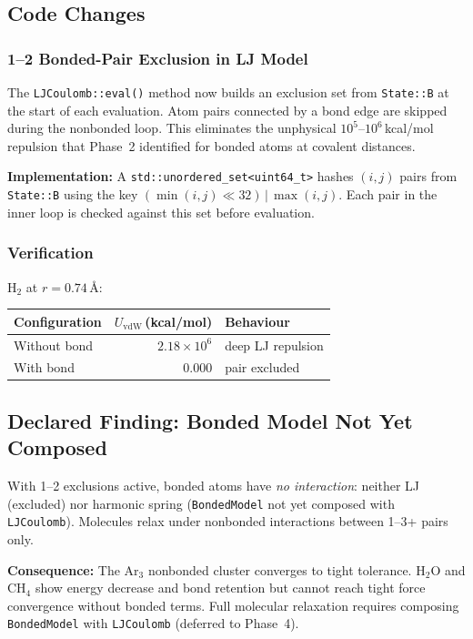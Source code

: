 \documentclass[11pt]{article}
\begin{document}
\subsection{Code Changes}

\subsubsection{1--2 Bonded-Pair Exclusion in LJ Model}

The \texttt{LJCoulomb::eval()} method now builds an exclusion set from
\texttt{State::B} at the start of each evaluation.  Atom pairs connected by
a bond edge are skipped during the nonbonded loop.  This eliminates the
unphysical $10^5$--$10^6$\,kcal/mol repulsion that Phase~2 identified for
bonded atoms at covalent distances.

\textbf{Implementation:} A \texttt{std::unordered\_set<uint64\_t>} hashes
$(i,j)$ pairs from \texttt{State::B} using the key
$(\min(i,j) \ll 32) \,|\, \max(i,j)$.  Each pair in the inner loop is
checked against this set before evaluation.

\subsubsection{Verification}

H$_2$ at $r = 0.74$\,\AA:
\begin{center}
\begin{tabular}{lrl}
\toprule
Configuration & $U_{\mathrm{vdW}}$\,(kcal/mol) & Behaviour \\
\midrule
Without bond & $2.18 \times 10^{6}$ & deep LJ repulsion \\
With bond    & $0.000$ & pair excluded \\
\bottomrule
\end{tabular}
\end{center}

\subsection{Declared Finding: Bonded Model Not Yet Composed}

With 1--2 exclusions active, bonded atoms have \emph{no interaction}:
neither LJ (excluded) nor harmonic spring (\texttt{BondedModel} not yet
composed with \texttt{LJCoulomb}).  Molecules relax under nonbonded
interactions between 1--3+ pairs only.

\textbf{Consequence:} The Ar$_3$ nonbonded cluster converges to tight
tolerance.  H$_2$O and CH$_4$ show energy decrease and bond retention but
cannot reach tight force convergence without bonded terms.  Full molecular
relaxation requires composing \texttt{BondedModel} with \texttt{LJCoulomb}
(deferred to Phase~4).
\end{document}
